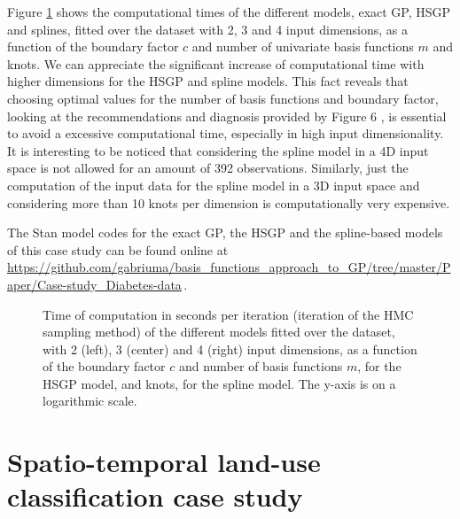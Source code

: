 \documentclass[onecolumn,a4paper,11pt]{article}
\begin{document}
Figure \ref{ch5_fig20_time2D_diabetes} shows the computational times of the different models, exact GP, HSGP and splines, fitted over the dataset with 2, 3 and 4 input dimensions, as a function of the boundary factor $c$ and number of univariate basis functions $m$ and knots. We can appreciate the significant increase
of computational time with higher dimensions for the HSGP and spline models.
This fact reveals that choosing optimal values for the number of basis functions and
boundary factor, looking at the recommendations and diagnosis provided by Figure 6%
, is essential to avoid a excessive computational time, especially in high input
dimensionality. It is interesting to be noticed that considering the spline model in a 4D input space is not allowed for an amount of 392
observations. Similarly, just the computation of the input data for the spline model
in a 3D input space and considering more than 10 knots per dimension is computationally very expensive.

The Stan model codes for the exact GP, the HSGP and the spline-based models of this case study can be found online at {\small \url{https://github.com/gabriuma/basis_functions_approach_to_GP/tree/master/Paper/Case-study_Diabetes-data}}\,.

\begin{figure}
\centering
{}
\caption{Time of computation in seconds per iteration (iteration of the HMC sampling method) of the different models fitted over the dataset, with 2 (left), 3 (center) and 4 (right) input dimensions, as a function of the boundary factor $c$ and number of basis functions $m$, for the HSGP model, and knots, for the spline model. The y-axis is on a logarithmic scale.}
  \label{ch5_fig20_time2D_diabetes}
\end{figure}


\section{Spatio-temporal land-use classification case study}\label{ch5_sec_application_caseII}
\end{document}

